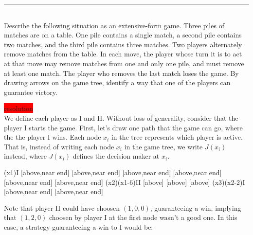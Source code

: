 \documentclass[10pt]{report}
\newenvironment{exercise}[1]
    {\vspace{0.5cm}\hrule\vspace{0.5cm}\noindent\fbox{#1}\\}
    {\vspace{0.5cm}}
\newenvironment{response}
{\vspace{0.2cm}\noindent\colorbox{red}{resolution}}
    {\vspace{0.5cm}}
\begin{document}
\begin{exercise}{3.1}
	Describe the following situation as an extensive-form game. Three piles of matches are on a table. One pile contains a single match, a second pile contains two matches, and the third pile contains three matches. Two players alternately remove matches from the table. In each move, the player whose turn it is to act at that move may remove matches from one and only one pile, and must remove at least one match. The player who removes the last match loses the game. By drawing arrows on the game tree, identify a way that one of the players can guarantee victory.

	\begin{response}\\
		We define each player as I and II. Without loss of generality, consider that the player I starts the game. First, let's draw one path that the game can go, where the the player I wins. Each node $x_{i}$ in the tree represents which player is active. That is, instead of writing each node $ x_{i} $ in the game tree, we write $J(x_{i})$ instead, where $ J(x_{i}) $ defines the decision maker at $ x_{i} $.

		\vspace{0.5cm}
		\begin{istgame}[sloped,font=\tiny]
			\setistOvalNodeStyle{.6cm}
			\xtShowEndPoints[oval node, minimum size=6pt]
			\xtdistance{40mm}{10mm}
			\istrooto[right](x1){I}
			[above,near end]
			[above,near end]
			[above,near end]
			[above,near end]
			[above,near end]
			[above,near end]
			\endist
			\istrooto[right](x2)(x1-6){II}
			[above]
			[above]
			[above]
			\endist
			\istrooto[right](x3)(x2-2){I}
			[above,near end]{}
			[above,near end]{}
			\endist
		\end{istgame}

		Note that player II could have choosen $ (1,0,0) $, guaranteeing a win, implying that $ (1,2,0) $ choosen by player I at the first node wasn't a good one. In this case, a strategy guaranteeing a win to I would be:


\end{response}
\end{exercise}
\end{document}
